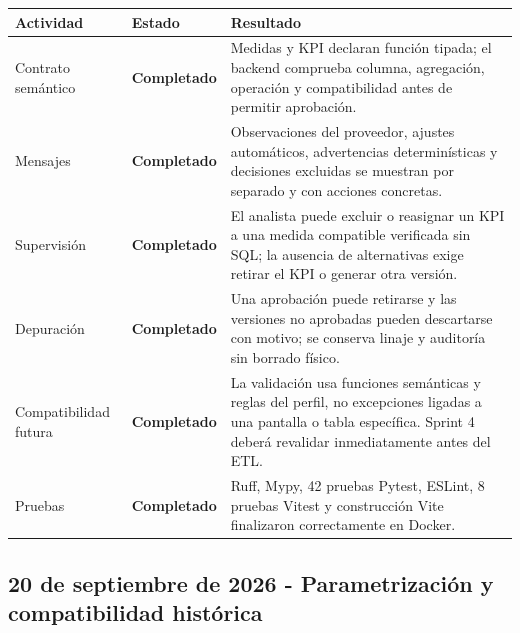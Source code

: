 \documentclass[11pt,letterpaper]{article}
\newcommand{\statusok}{\textcolor{deepgreen}{\textbf{Completado}}}
\begin{document}
\begin{longtable}{@{}p{}p{}p{}@{}}
  \toprule
  \textbf{Actividad} & \textbf{Estado} & \textbf{Resultado} \\
  \midrule
  Contrato semántico & \statusok & Medidas y KPI declaran función tipada; el backend comprueba columna, agregación, operación y compatibilidad antes de permitir aprobación. \\
  Mensajes & \statusok & Observaciones del proveedor, ajustes automáticos, advertencias determinísticas y decisiones excluidas se muestran por separado y con acciones concretas. \\
  Supervisión & \statusok & El analista puede excluir o reasignar un KPI a una medida compatible verificada sin SQL; la ausencia de alternativas exige retirar el KPI o generar otra versión. \\
  Depuración & \statusok & Una aprobación puede retirarse y las versiones no aprobadas pueden descartarse con motivo; se conserva linaje y auditoría sin borrado físico. \\
  Compatibilidad futura & \statusok & La validación usa funciones semánticas y reglas del perfil, no excepciones ligadas a una pantalla o tabla específica. Sprint 4 deberá revalidar inmediatamente antes del ETL. \\
  Pruebas & \statusok & Ruff, Mypy, 42 pruebas Pytest, ESLint, 8 pruebas Vitest y construcción Vite finalizaron correctamente en Docker. \\
  \bottomrule
\end{longtable}

\subsection{20 de septiembre de 2026 - Parametrización y compatibilidad histórica}
\end{document}
